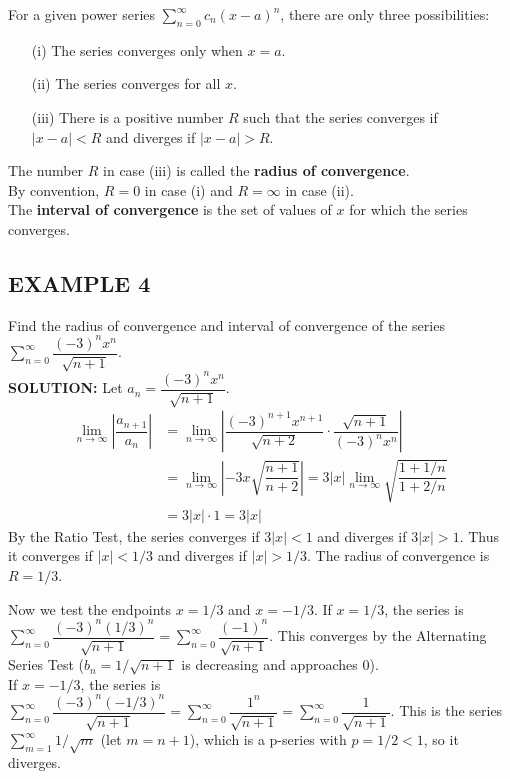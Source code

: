 \documentclass{article}
\theoremstyle{mystyle}
\begin{document}
\begin{tcolorbox}[
    colback=white,
    colframe=orange!80!white,
    title=Theorem: Convergence of a Power Series,
    boxrule=0.5mm,
    arc=3mm
    ]
    For a given power series \( \sum_{n=0}^{\infty} c_n (x-a)^n \), there are only three possibilities:
    \begin{itemize}
        \item[(i)] The series converges only when \(x=a\).
        \item[(ii)] The series converges for all \(x\).
        \item[(iii)] There is a positive number \(R\) such that the series converges if \(|x-a| < R\) and diverges if \(|x-a| > R\).
    \end{itemize}
    The number \(R\) in case (iii) is called the \textbf{radius of convergence}.\\
    By convention, \(R=0\) in case (i) and \(R=\infty\) in case (ii). \\
    The \textbf{interval of convergence} is the set of values of \(x\) for which the series converges.
\end{tcolorbox}

\subsection*{EXAMPLE 4}
Find the radius of convergence and interval of convergence of the series \( \sum_{n=0}^{\infty} \dfrac{(-3)^n x^n}{\sqrt{n+1}} \).\\
\textbf{SOLUTION:}
Let \(a_n = \dfrac{(-3)^n x^n}{\sqrt{n+1}}\).
\begin{align*}
    \lim_{n\to\infty} \left| \dfrac{a_{n+1}}{a_n} \right| &= \lim_{n\to\infty} \left| \dfrac{(-3)^{n+1} x^{n+1}}{\sqrt{n+2}} \cdot \dfrac{\sqrt{n+1}}{(-3)^n x^n} \right| \\
    &= \lim_{n\to\infty} \left| -3x \sqrt{\dfrac{n+1}{n+2}} \right| = 3|x| \lim_{n\to\infty} \sqrt{\dfrac{1+1/n}{1+2/n}} \\
    &= 3|x| \cdot 1 = 3|x|
\end{align*}
By the Ratio Test, the series converges if \(3|x| < 1\) and diverges if \(3|x| > 1\). Thus it converges if \(|x| < 1/3\) and diverges if \(|x| > 1/3\).
The radius of convergence is \(R = 1/3\).

Now we test the endpoints \(x=1/3\) and \(x=-1/3\).
If \(x=1/3\), the series is \( \sum_{n=0}^\infty \dfrac{(-3)^n (1/3)^n}{\sqrt{n+1}} = \sum_{n=0}^\infty \dfrac{(-1)^n}{\sqrt{n+1}} \). This converges by the Alternating Series Test (\(b_n = 1/\sqrt{n+1}\) is decreasing and approaches 0).\\
If \(x=-1/3\), the series is \( \sum_{n=0}^\infty \dfrac{(-3)^n (-1/3)^n}{\sqrt{n+1}} = \sum_{n=0}^\infty \dfrac{1^n}{\sqrt{n+1}} = \sum_{n=0}^\infty \dfrac{1}{\sqrt{n+1}} \). This is the series \( \sum_{m=1}^\infty 1/\sqrt{m} \) (let \(m=n+1\)), which is a p-series with \(p=1/2 < 1\), so it diverges.
\end{document}

